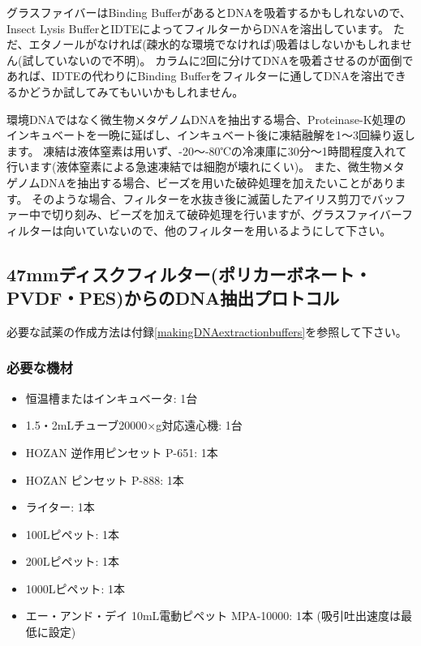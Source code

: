 \documentclass[titlepage,10pt,a4paper,uplatex]{jsbook}
\begin{document}
グラスファイバーはBinding BufferがあるとDNAを吸着するかもしれないので、Insect Lysis BufferとIDTEによってフィルターからDNAを溶出しています。
ただ、エタノールがなければ(疎水的な環境でなければ)吸着はしないかもしれません(試していないので不明)。
カラムに2回に分けてDNAを吸着させるのが面倒であれば、IDTEの代わりにBinding Bufferをフィルターに通してDNAを溶出できるかどうか試してみてもいいかもしれません。

環境DNAではなく微生物メタゲノムDNAを抽出する場合、Proteinase-K処理のインキュベートを一晩に延ばし、インキュベート後に凍結融解を1～3回繰り返します。
凍結は液体窒素は用いず、{-20}～{-80}℃の冷凍庫に30分～1時間程度入れて行います(液体窒素による急速凍結では細胞が壊れにくい)。
また、微生物メタゲノムDNAを抽出する場合、ビーズを用いた破砕処理を加えたいことがあります。
そのような場合、フィルターを水抜き後に滅菌したアイリス剪刀でバッファー中で切り刻み、ビーズを加えて破砕処理を行いますが、グラスファイバーフィルターは向いていないので、他のフィルターを用いるようにして下さい。

\subsection{47mmディスクフィルター(ポリカーボネート・PVDF・PES)からのDNA抽出プロトコル}

必要な試薬の作成方法は付録\ref{makingDNAextractionbuffers}を参照して下さい。

\subsubsection{必要な機材}
\begin{itemize}
\item 恒温槽またはインキュベータ: 1台
\item 1.5・2mLチューブ20000×g対応遠心機: 1台
\item HOZAN 逆作用ピンセット P-651: 1本
\item HOZAN ピンセット P-888: 1本
\item ライター: 1本
\item 100{\textmu}Lピペット: 1本
\item 200{\textmu}Lピペット: 1本
\item 1000{\textmu}Lピペット: 1本
\item エー・アンド・デイ 10mL電動ピペット MPA-10000: 1本 (吸引吐出速度は最低に設定)
\end{itemize}
\end{document}
